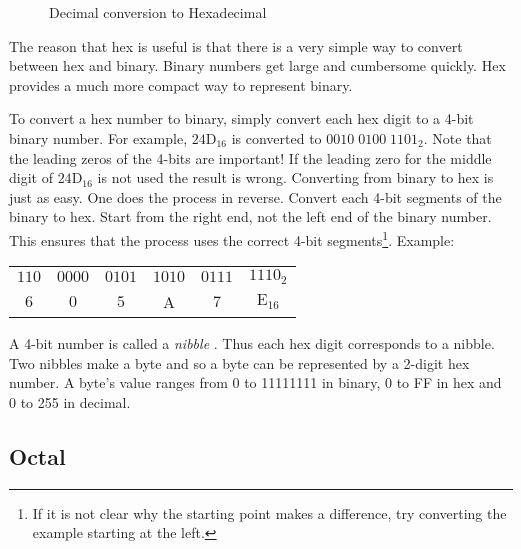 \begin{figure}[t]
\caption{Decimal conversion to Hexadecimal \label{fig:hex-conv}}
\end{figure}

The reason that hex is useful is that there is a very simple way to
convert between hex and binary. Binary numbers get large and
cumbersome quickly. Hex provides a much more compact way to represent
binary.

To convert a hex number to binary, simply convert each hex digit to a
4-bit binary number. For example, $\mathrm{24D}_{16}$ is converted to
\mbox{$0010\;0100\; 1101_2$}. Note that the leading zeros of the
4-bits are important! If the leading zero for the middle digit of
$\mathrm{24D}_{16}$ is not used the result is wrong. Converting from
binary to hex is just as easy. One does the process in reverse. Convert
each 4-bit segments of the binary to hex. Start from the
right end, not the left end of the binary number. This ensures that
the process uses the correct 4-bit segments\footnote{If it is not
clear why the starting point makes a difference, try converting the
example starting at the left.}. Example:\newline

\begin{tabular}{cccccc}
$110$ & $0000$ & $0101$ & $1010$ & $0111$ & $1110_2$ \\
  $6$ & $0$    &   $5$  &   A  &  $7$   &    $\mathrm{E}_{16}$ \\
\end{tabular}\newline

A 4-bit number is called a \emph{nibble} . Thus each hex
digit corresponds to a nibble. Two nibbles make a byte and so a byte
can be represented by a 2-digit hex number. A byte's value ranges from
0 to 11111111 in binary, 0 to FF in hex and 0 to 255 in decimal.

\subsection{Octal}

